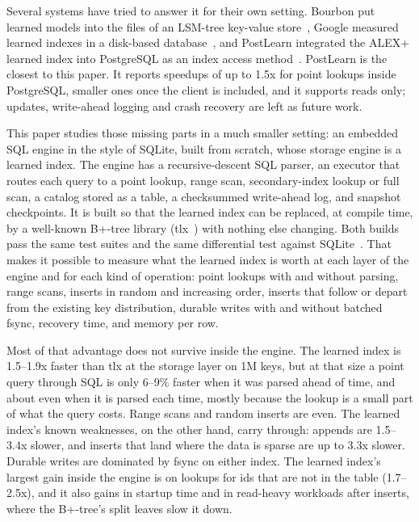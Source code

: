 \documentclass[conference]{IEEEtran}
\begin{document}
Several systems have tried to answer it for their own setting. Bourbon put
learned models into the files of an LSM-tree key-value store~\cite{dai2020},
Google measured learned indexes in a disk-based database~\cite{abulibdeh2020},
and PostLearn integrated the ALEX+ learned index into PostgreSQL as an index
access method~\cite{fuad2026}. PostLearn is the closest to this paper. It
reports speedups of up to 1.5x for point lookups inside PostgreSQL, smaller
ones once the client is included, and it supports reads only; updates,
write-ahead logging and crash recovery are left as future work.

This paper studies those missing parts in a much smaller setting: an
embedded SQL engine in the style of SQLite, built from scratch, whose
storage engine is a learned index. The engine has a recursive-descent SQL
parser, an executor that routes each query to a point lookup, range scan,
secondary-index lookup or full scan, a catalog stored as a table, a
checksummed write-ahead log, and snapshot checkpoints. It is built so that
the learned index can be replaced, at compile time, by a well-known B+-tree
library (tlx~\cite{tlx}) with nothing else changing. Both builds pass the
same test suites and the same differential test against
SQLite~\cite{sqlite}. That makes it possible to measure what the learned
index is worth at each layer of the engine and for each kind of operation:
point lookups with and without parsing, range scans, inserts in random and
increasing order, inserts that follow or depart from the existing key
distribution, durable writes with and without batched fsync, recovery time,
and memory per row.

Most of that advantage does not survive inside the engine. The
learned index is 1.5--1.9x faster than tlx at the storage layer on 1M
keys, but at that size a point query through SQL is only 6--9\% faster when it
was parsed ahead of time, and about even when it is parsed each time, mostly
because the lookup is a small part of what the query costs. Range scans and random
inserts are even. The learned index's known weaknesses, on the other
hand, carry through: appends are 1.5--3.4x slower, and inserts that
land where the data is sparse are up to 3.3x slower. Durable writes are
dominated by fsync on either index. The learned index's largest gain inside
the engine is on lookups for ids that are not in the table (1.7--2.5x), and it
also gains in startup time and in read-heavy workloads after inserts, where the
B+-tree's split leaves slow it down.
\end{document}
